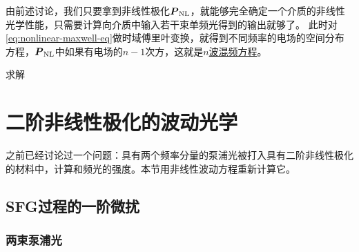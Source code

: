 \documentclass[UTF8, a4paper]{ctexart}
\newcommand{\concept}[1]{\underline{#1}}
\begin{document}
由前述讨论，我们只要拿到非线性极化$\vb*{P}_\text{NL}$，就能够完全确定一个介质的非线性光学性能，只需要计算向介质中输入若干束单频光得到的输出就够了。
此时对\eqref{eq:nonlinear-maxwell-eq}做时域傅里叶变换，就得到不同频率的电场的空间分布方程，$\vb*{P}_\text{NL}$中如果有电场的$n-1$次方，这就是\concept{$n$波混频方程}。

求解

\section{二阶非线性极化的波动光学}

之前已经讨论过一个问题：具有两个频率分量的泵浦光被打入具有二阶非线性极化的材料中，计算和频光的强度。本节用非线性波动方程重新计算它。

\subsection{SFG过程的一阶微扰}

\subsubsection{两束泵浦光}
\end{document}

